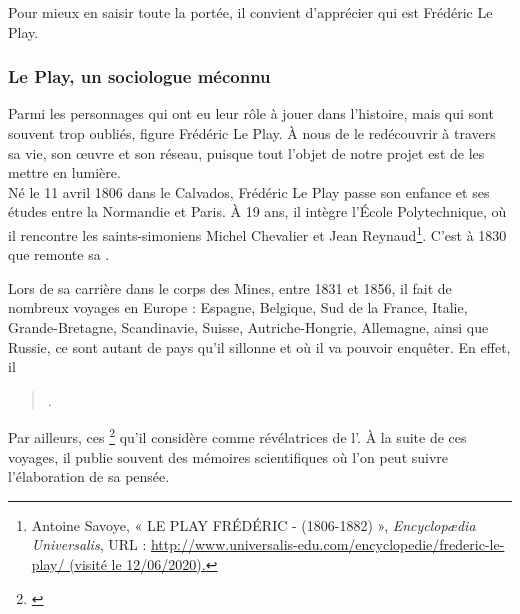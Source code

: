 Pour mieux en saisir toute la portée, il convient d'apprécier qui est Frédéric Le Play.

\subsubsection{Le Play, un sociologue méconnu}

Parmi les personnages qui ont eu leur rôle à jouer dans l'histoire, mais qui sont souvent trop oubliés, figure Frédéric Le Play. À nous de le redécouvrir à travers sa vie, son \oe uvre et son réseau, puisque tout l'objet de notre projet est de les mettre en lumière.\\

Né le 11 avril 1806 dans le Calvados, Frédéric Le Play passe son enfance et ses études entre la Normandie et Paris. À 19 ans, il intègre l'École Polytechnique, où il rencontre les saints-simoniens Michel Chevalier et Jean Reynaud\footnote {Antoine Savoye, « LE PLAY FRÉDÉRIC -
(1806-1882) », \emph{Encyclopædia Universalis}, URL : \url{http://www.universalis-edu.com/encyclopedie/frederic-le-play/ (visité le 12/06/2020).}}. C'est à 1830 que remonte sa . 

Lors de sa carrière dans le corps des Mines, entre 1831 et 1856, il fait de nombreux voyages en Europe : Espagne, Belgique, Sud de la France, Italie, Grande-Bretagne, Scandinavie, Suisse, Autriche-Hongrie, Allemagne, ainsi que Russie, ce sont autant de pays qu'il sillonne et où il va pouvoir enquêter.
En effet, il
\begin{quote}
.
\end{quote}
Par ailleurs, ces
\footnote{\cite{savoye_lp_qqdates}} qu'il considère comme révélatrices de l'. À la suite de ces voyages, il publie souvent des mémoires scientifiques où l'on peut suivre l'élaboration de sa pensée.

